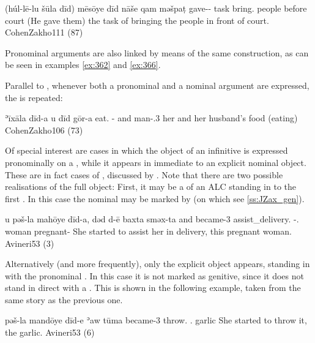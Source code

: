{(húl-lē-lu šūla dīd) mēsōye dīd nāše qam məšpaṭ}
{gave-\masc-\pl{} task \lnkd{} bring.\inf{} \lnkd{} people before court}
{(He gave them) the task of bringing the people in front of court.}
	{CohenZakho}{111 (87)}
	
Pronominal arguments are also linked by means of the same construction, as can be seen in examples \vref{ex:362} and \vref{ex:366}.

Parallel to , whenever both a pronominal and a nominal argument are expressed, the \lnk* is repeated:

{ʾīxāla\footnotemark{} dīd-a u\cb{} dīd  gōr-a}
{eat.\inf{} \lnkd-\fem{} and\cb{} \lnkd{} man-\poss.3\fem}
{her and her husband’s food (eating)}
{CohenZakho}{106 (73)}


Of special interest are cases in which the object of an infinitive is expressed pronominally on a \lnk*, while it appears in immediate  to an explicit nominal object. These are in fact cases of ,  discussed by \citet[142--4]{CohenZakho}. Note that there are two possible realisations of the full object: First, it may be a \secn of an ALC standing in  to the first \lnk*. In this case the nominal may be marked by  (on which see \ref{ss:JZax_gen}).

{u\cb{} pəš-la mahōye dīd-a, dəd d-ē baxta sməx-ta}
{and\cb{} became-3\fem{} assist\_delivery.\inf{} \fem{} \lnkd{} \gen-\dem.\fem{} woman pregnant-\fem}
{She started to assist her in delivery, this pregnant woman.}
{Avineri}{53 (3)}

Alternatively (and more frequently), only the explicit object appears, standing in  with the pronominal \secn. In this case it is not marked as genitive, since it does not stand in direct  with a \lnk*. This is shown in the following example, taken from the same story as the previous one. 

{pəš-la mandōye dīd-e ʾaw tūma}
{became-3\fem{} throw.\inf{} \masc{} .\masc{} garlic}
{She started to throw it, the garlic.}
{Avineri}{53 (6)}
 
